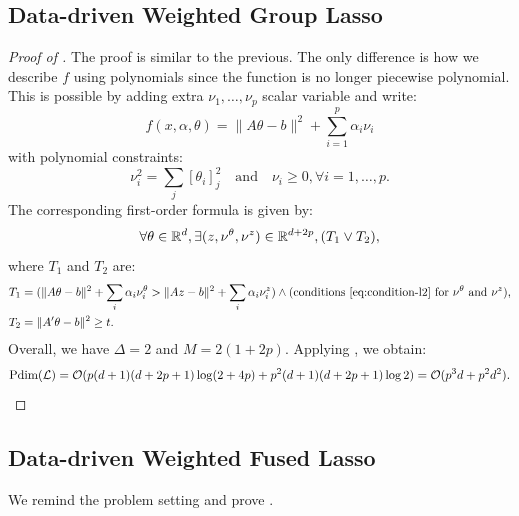 \subsection{Data-driven Weighted Group Lasso}
\begin{proof}[Proof of ]
    The proof is similar to the previous. The only difference is how we describe $f$ using polynomials since the function is no longer piecewise polynomial. This is possible by adding extra $\nu_1, \ldots, \nu_p$ scalar variable and write:
	\begin{equation*}
		f(x, \alpha, \theta) = \|A\theta - b\|^2 + \sum_{i  = 1}^p \alpha_i \nu_i 
	\end{equation*}
	with polynomial constraints:
	\begin{equation}
		\label{eq:condition-l2}
		\nu_i^2 = \sum_{j} [\theta_i]_j^2 \quad \text{and} \quad \nu_i \geq 0, \forall i = 1, \ldots, p.
	\end{equation}
	The corresponding first-order formula is given by:
	\begin{equation*}
			\forall \theta \in \mathbb{R}^d, \exists (z, \nu^\theta,\nu^{z}) \in \mathbb{R}^{d+2p},(T_1 \lor T_2),
	\end{equation*}
	where $T_1$ and $T_2$ are:
	\begin{equation*}
		\begin{aligned}
			T_1 &= (\|A\theta - b\|^2 + \sum_{i} \alpha_i \nu_i^\theta >  \|Az - b\|^2 + \sum_{i} \alpha_i \nu_i^z) \land (\text{conditions } \eqref{eq:condition-l2} \text{ for } \nu^\theta \text{ and } \nu^z), \\
			T_2 &= \|A'\theta -  b\|^2 \geq t.
		\end{aligned}
	\end{equation*}
	Overall, we have $\Delta = 2$ and $M = 2(1 + 2p)$. Applying , we obtain:
	\begin{equation*}
		\text{\normalfont Pdim}(\mathcal{L}) = \mathcal{O}(p(d+1)(d + 2p + 1)\log (2 + 4p) + p^2(d+1)(d + 2p + 1)\log 2) = \mathcal{O}(p^3d + p^2d^2). \qedhere
	\end{equation*}
\end{proof}


\subsection{Data-driven Weighted Fused Lasso}

We remind the problem setting and prove .


